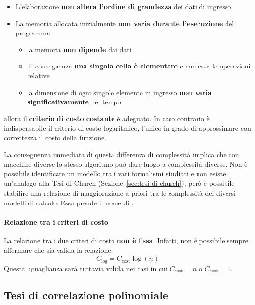 \documentclass[italian, 10pt]{article}
\begin{document}
\begin{itemize}
  \item L'elaborazione \textbf{non altera l'ordine di grandezza} dei dati di ingresso
  \item La memoria allocata inizialmente \textbf{non varia durante l'esecuzione} del programma
        \begin{itemize}
          \item la memoria \textbf{non dipende} dai dati
          \item di conseguenza \textbf{una singola cella è elementare} e con essa le operazioni relative
          \item la dimensione di ogni singolo elemento in ingresso \textbf{non varia significativamente} nel tempo
        \end{itemize}
\end{itemize}

allora il \textbf{criterio di costo costante} è adeguato.
In caso contrario è indispensabile il criterio di costo logaritmico, l'unico in grado di approssimare con correttezza il costo della funzione.

\bigskip
La conseguenza immediata di questa differenza di complessità implica che con macchine diverse lo stesso algoritmo può dare luogo a complessità diverse.
Non è possibile identificare un modello  tra i vari formalismi studiati e non esiste un'analogo alla Tesi di Church (Sezione~\ref{sec:tesi-di-church}), però è possibile stabilire una relazione di maggiorazione a priori tra le complessità dei diversi modelli di calcolo.
Essa prende il nome di \textit{}.

\paragraph{Relazione tra i criteri di costo}

La relazione tra i due criteri di costo \textbf{non è fissa}.
Infatti, non è possibile sempre affermare che sia valida la relazione:
\[ C_{\text{log}} = C_{\text{cost}} \log{(n)} \]
Questa uguaglianza sarà tuttavia valida nei casi in cui \(C_{\text{cost}} = n\) o \(C_{\text{cost}} = 1\).


\subsection{Tesi di correlazione polinomiale}
\label{sec:tesi-correlazione-polinomiale}
\end{document}
